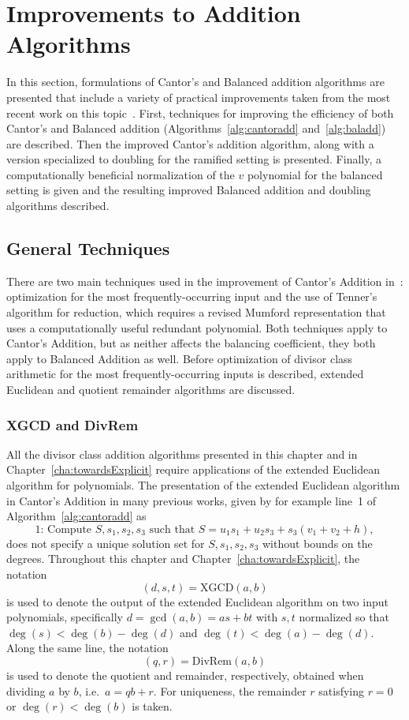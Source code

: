 \section{Improvements to Addition Algorithms}\label{sec:improvements} In this
section, formulations of Cantor's and Balanced addition algorithms are presented
that include a variety of practical improvements taken from the most recent work
on this topic~\cite{ImbJac13:amc}. First, techniques for improving the
efficiency of both Cantor's and Balanced addition
(Algorithms~\ref{alg:cantoradd} and~\ref{alg:baladd}) are described. Then the
improved Cantor's addition algorithm, along with a version specialized to
doubling for the ramified setting is presented. Finally, a computationally
beneficial normalization of the $v$ polynomial for the balanced setting is given
and the resulting improved Balanced addition and doubling algorithms described.

\subsection{General Techniques}\label{sec:polytechniques} There are two main
techniques used in the improvement of Cantor's Addition in~\cite{ImbJac13:amc}:
optimization for the most frequently-occurring input and the use of Tenner's
algorithm for reduction, which requires a revised Mumford representation that
uses a computationally useful redundant polynomial. Both techniques apply to
Cantor's Addition, but as neither affects the balancing coefficient, they both
apply to Balanced Addition as well. Before optimization of divisor class
arithmetic for the most frequently-occurring inputs is described, extended
Euclidean and quotient remainder algorithms are discussed.

\subsubsection{XGCD and DivRem}\label{sec:XGCDDivRem}
All the divisor class addition algorithms presented in this chapter and in
Chapter~\ref{cha:towardsExplicit} require applications of the extended
Euclidean algorithm for polynomials. The presentation of
the extended Euclidean algorithm in Cantor's Addition in many previous works, given by for example
line~1 of Algorithm~\ref{alg:cantoradd} as $$\mbox{1: Compute }S,s_1,s_2,s_3
\mbox{ such that } S = u_1s_1 + u_2s_3 + s_3(v_1 + v_2 + h),$$ does not specify
a unique solution set for $S,s_1,s_2,s_3$ without bounds on the degrees.
Throughout this chapter and Chapter~\ref{cha:towardsExplicit}, the notation
$$(d,s,t) = \mathrm{XGCD}(a,b)$$ is used to denote the output of the extended
Euclidean algorithm on two input polynomials, specifically $d = \gcd(a,b) = as +
bt$ with $s,t$ normalized so that $\deg(s) < \deg(b) - \deg(d)$ and $\deg(t) <
\deg(a) - \deg(d).$ Along the same line, the notation $$(q,r) =
\mathrm{DivRem}(a,b)$$ is used to denote the quotient and remainder,
respectively, obtained when dividing $a$ by $b$, i.e.\ $a = qb + r$. For
uniqueness, the remainder $r$ satisfying $r = 0$ or $\deg(r) < \deg(b)$ is
taken.


